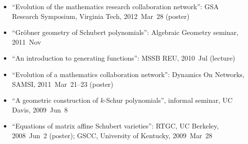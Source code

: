 \documentclass[10pt,a4paper]{article}
\begin{document}
\begin{itemize}[label=$\circ$,nolistsep]
\item
``Evolution of the mathematics research collaboration network'': GSA Research Symposium, Virginia Tech, 2012~Mar~28 (poster)
\item
``Gr\"obner geometry of Schubert polynomials'': Algebraic Geometry seminar, 2011~Nov
\item
``An introduction to generating functions'': MSSB REU, 2010~Jul (lecture)
\item
``Evolution of a mathematics collaboration network'': Dynamics On Networks, SAMSI, 2011~Mar~21--23 (poster)
\item
``A geometric construction of \(k\)-Schur polynomials'', informal seminar, UC Davis, 2009~Jun~8
\item
``Equations of matrix affine Schubert varieties'': RTGC, UC Berkeley, 2008~Jun~2 (poster); GSCC, University of Kentucky, 2009~Mar~28
\end{itemize}
\end{document}
